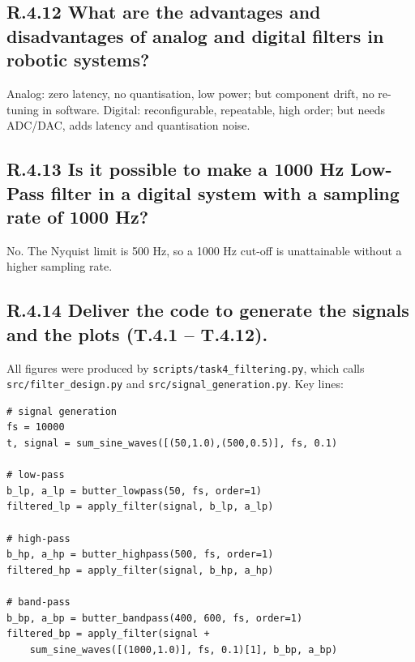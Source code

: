 \documentclass{article}
\begin{document}
\subsection*{R.4.12 What are the advantages and disadvantages of analog and digital filters in robotic systems?}

Analog: zero latency, no quantisation, low power; but component drift, no re-tuning in software.  
Digital: reconfigurable, repeatable, high order; but needs ADC/DAC, adds latency and quantisation noise.

\subsection*{R.4.13 Is it possible to make a 1000 Hz Low-Pass filter in a digital system with a sampling rate of 1000 Hz?}

No.  The Nyquist limit is 500 Hz, so a 1000 Hz cut-off is unattainable without a higher sampling rate.

\subsection*{R.4.14 Deliver the code to generate the signals and the plots (T.4.1 – T.4.12).}

All figures were produced by \texttt{scripts/task4\_filtering.py}, which calls
\texttt{src/filter\_design.py} and \texttt{src/signal\_generation.py}.  
Key lines:

\begin{verbatim}
# signal generation
fs = 10000
t, signal = sum_sine_waves([(50,1.0),(500,0.5)], fs, 0.1)

# low-pass
b_lp, a_lp = butter_lowpass(50, fs, order=1)
filtered_lp = apply_filter(signal, b_lp, a_lp)

# high-pass
b_hp, a_hp = butter_highpass(500, fs, order=1)
filtered_hp = apply_filter(signal, b_hp, a_hp)

# band-pass
b_bp, a_bp = butter_bandpass(400, 600, fs, order=1)
filtered_bp = apply_filter(signal + 
    sum_sine_waves([(1000,1.0)], fs, 0.1)[1], b_bp, a_bp)
\end{verbatim}



\end{document}
